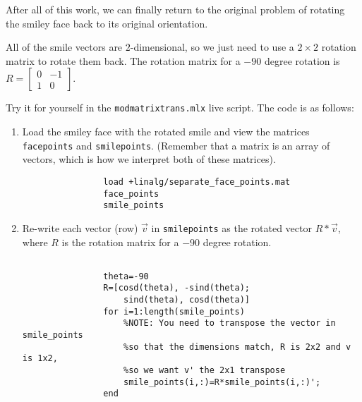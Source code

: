 \documentclass{ximera}
\begin{document}
\begin{exploration}
\begin{remark}
\begin{example}
\begin{hint}
            \end{hint}

        \end{example}

    \end{remark}

    \begin{example}

        After all of this work, we can finally return to the original problem of rotating the smiley face back to its original orientation.

        All of the smile vectors are $2$-dimensional, so we just need to use a $2\times 2$ rotation matrix to rotate them back. The rotation matrix for a $-90$ degree rotation is $R=\begin{bmatrix} 0 & -1 \\ 1 & 0 \end{bmatrix}$.

        Try it for yourself in the \texttt{mod\textunderscore matrix\textunderscore trans.mlx} live script. The code is as follows:
        \begin{enumerate}

            \item Load the smiley face with the rotated smile and view the matrices \texttt{face\textunderscore points} and \texttt{smile\textunderscore points}. (Remember that a matrix is an array of vectors, which is how we interpret both of these matrices).
            \begin{verbatim}
                load +linalg/separate_face_points.mat
                face_points
                smile_points
            \end{verbatim}

            \item Re-write each vector (row) $\vec{v}$ in \texttt{smile\textunderscore points} as the rotated vector $R*\vec{v}$, where $R$ is the rotation matrix for a $-90$ degree rotation.
            
            \begin{verbatim}

                theta=-90
                R=[cosd(theta), -sind(theta);
                    sind(theta), cosd(theta)]
                for i=1:length(smile_points)
                    %NOTE: You need to transpose the vector in smile_points 
                    %so that the dimensions match, R is 2x2 and v is 1x2, 
                    %so we want v' the 2x1 transpose
                    smile_points(i,:)=R*smile_points(i,:)';
                end


\end{verbatim}
\end{enumerate}
\end{example}
\end{exploration}
\end{document}

